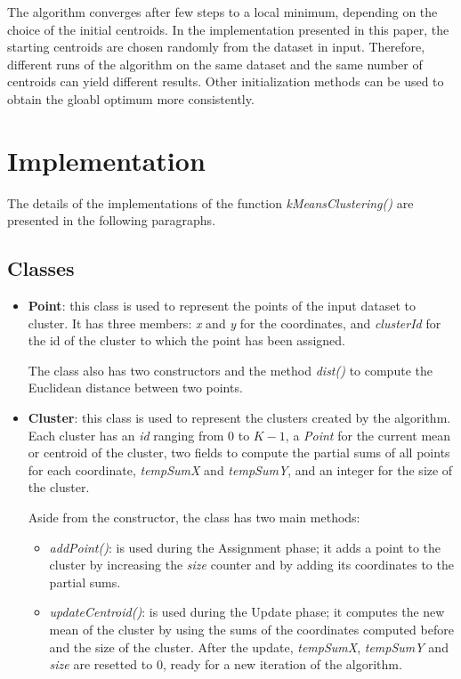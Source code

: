 \documentclass[10pt,twocolumn,letterpaper]{article}
\begin{document}
The algorithm converges after few steps to a local minimum, depending on the choice of the initial centroids. In the implementation presented in this paper, the starting centroids are chosen randomly from the dataset in input. Therefore, different runs of the algorithm on the same dataset and the same number of centroids can yield different results. Other initialization methods can be used to obtain the gloabl optimum more consistently.


\section{Implementation}
The details of the implementations of the function \textit{kMeansClustering()} are presented in the following paragraphs.

\subsection{Classes}
\begin{itemize}
	\item \textbf{Point}: this class is used to represent the points of the input dataset to cluster. It has three members: \textit{x} and \textit{y} for the coordinates, and \textit{clusterId} for the id of the cluster to which the point has been assigned. 
	
	The class also has two constructors and the method \textit{dist()} to compute the Euclidean distance between two points.
	
	\item \textbf{Cluster}: this class is used to represent the clusters created by the algorithm. Each cluster has an \textit{id} ranging from 0 to $K - 1$, a \textit{Point} for the current mean or centroid of the cluster, two fields to compute the partial sums of all points for each coordinate, \textit{tempSumX} and \textit{tempSumY}, and an integer for the size of the cluster.
	
	Aside from the constructor, the class has two main methods:
	\begin{itemize}
		\item \textit{addPoint()}: is used during the Assignment phase; it adds a point to the cluster by increasing the \textit{size} counter and by adding its coordinates to the partial sums.
		\item \textit{updateCentroid()}: is used during the Update phase; it computes the new mean of the cluster by using the sums of the coordinates computed before and the size of the cluster. After the update, \textit{tempSumX}, \textit{tempSumY} and \textit{size} are resetted to 0, ready for a new iteration of the algorithm.
	\end{itemize}
\end{itemize}
\end{document}
